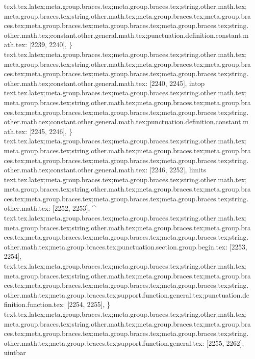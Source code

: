 {{{{{{{{{{{{{{{{{{{{{{{{{{{{{{{{{{{{{{{{{{{{{{{{{{{{{{{{{{{{{{{{{{{{{{{text.tex.latex;meta.group.braces.tex;meta.group.braces.tex;string.other.math.tex;meta.group.braces.tex;string.other.math.tex;meta.group.braces.tex;meta.group.braces.tex;meta.group.braces.tex;meta.group.braces.tex;meta.group.braces.tex;string.other.math.tex;constant.other.general.math.tex;punctuation.definition.constant.math.tex: [2239, 2240], {\}
text.tex.latex;meta.group.braces.tex;meta.group.braces.tex;string.other.math.tex;meta.group.braces.tex;string.other.math.tex;meta.group.braces.tex;meta.group.braces.tex;meta.group.braces.tex;meta.group.braces.tex;meta.group.braces.tex;string.other.math.tex;constant.other.general.math.tex: [2240, 2245], {intop}
text.tex.latex;meta.group.braces.tex;meta.group.braces.tex;string.other.math.tex;meta.group.braces.tex;string.other.math.tex;meta.group.braces.tex;meta.group.braces.tex;meta.group.braces.tex;meta.group.braces.tex;meta.group.braces.tex;string.other.math.tex;constant.other.general.math.tex;punctuation.definition.constant.math.tex: [2245, 2246], {\}
text.tex.latex;meta.group.braces.tex;meta.group.braces.tex;string.other.math.tex;meta.group.braces.tex;string.other.math.tex;meta.group.braces.tex;meta.group.braces.tex;meta.group.braces.tex;meta.group.braces.tex;meta.group.braces.tex;string.other.math.tex;constant.other.general.math.tex: [2246, 2252], {limits}
text.tex.latex;meta.group.braces.tex;meta.group.braces.tex;string.other.math.tex;meta.group.braces.tex;string.other.math.tex;meta.group.braces.tex;meta.group.braces.tex;meta.group.braces.tex;meta.group.braces.tex;meta.group.braces.tex;string.other.math.tex: [2252, 2253], {^}
text.tex.latex;meta.group.braces.tex;meta.group.braces.tex;string.other.math.tex;meta.group.braces.tex;string.other.math.tex;meta.group.braces.tex;meta.group.braces.tex;meta.group.braces.tex;meta.group.braces.tex;meta.group.braces.tex;string.other.math.tex;meta.group.braces.tex;punctuation.section.group.begin.tex: [2253, 2254], {{}
text.tex.latex;meta.group.braces.tex;meta.group.braces.tex;string.other.math.tex;meta.group.braces.tex;string.other.math.tex;meta.group.braces.tex;meta.group.braces.tex;meta.group.braces.tex;meta.group.braces.tex;meta.group.braces.tex;string.other.math.tex;meta.group.braces.tex;support.function.general.tex;punctuation.definition.function.tex: [2254, 2255], {\}
text.tex.latex;meta.group.braces.tex;meta.group.braces.tex;string.other.math.tex;meta.group.braces.tex;string.other.math.tex;meta.group.braces.tex;meta.group.braces.tex;meta.group.braces.tex;meta.group.braces.tex;meta.group.braces.tex;string.other.math.tex;meta.group.braces.tex;support.function.general.tex: [2255, 2262], {uintbar}
}}}}}}}}}}}}}}}}}}}}}}}}}}}}}}}}}}}}}}}}}}}}}}}}}}}}}}}}}}}}}}}}}}}}}}}}}}}

